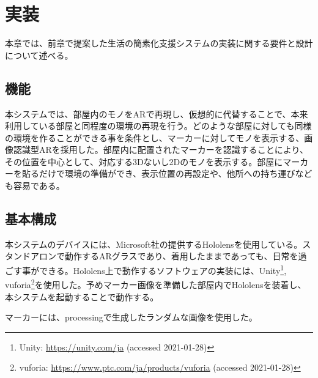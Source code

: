 
\chapter{実装}
\label{chap:implementation}

本章では、前章で提案した生活の簡素化支援システムの実装に関する要件と設計について述べる。

\newpage

\section{機能}
本システムでは、部屋内のモノをARで再現し、仮想的に代替することで、本来利用している部屋と同程度の環境の再現を行う。どのような部屋に対しても同様の環境を作ることができる事を条件とし、マーカーに対してモノを表示する、画像認識型ARを採用した。部屋内に配置されたマーカーを認識することにより、その位置を中心として、対応する3Dないし2Dのモノを表示する。部屋にマーカーを貼るだけで環境の準備ができ、表示位置の再設定や、他所への持ち運びなども容易である。

\section{基本構成}

本システムのデバイスには、Microsoft社の提供するHololensを使用している。スタンドアロンで動作するARグラスであり、着用したままであっても、日常を過ごす事ができる。Hololens上で動作するソフトウェアの実装には、Unity\footnote{Unity: \url{https://unity.com/ja} (accessed 2021-01-28)}, vuforia\footnote{vuforia: \url{https://www.ptc.com/ja/products/vuforia} (accessed 2021-01-28)}を使用した。予めマーカー画像を準備した部屋内でHololensを装着し、本システムを起動することで動作する。

マーカーには、processingで生成したランダムな画像を使用した。

